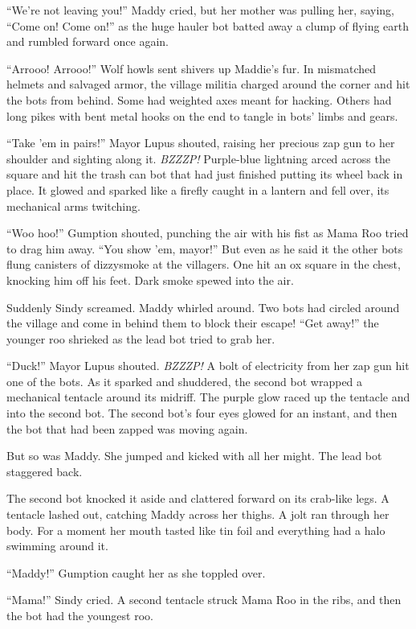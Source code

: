 \documentclass[10pt]{article}
\begin{document}
``We're not leaving you!'' Maddy cried, but her mother was pulling her,
saying, ``Come on! Come on!'' as the huge hauler bot batted away a clump
of flying earth and rumbled forward once again.

``Arrooo! Arrooo!'' Wolf howls sent shivers up Maddie's fur. In
mismatched helmets and salvaged armor, the village militia charged
around the corner and hit the bots from behind. Some had weighted axes
meant for hacking. Others had long pikes with bent metal hooks on the
end to tangle in bots' limbs and gears.

``Take 'em in pairs!'' Mayor Lupus shouted, raising her precious zap gun
to her shoulder and sighting along it. \emph{BZZZP!} Purple-blue
lightning arced across the square and hit the trash can bot that had
just finished putting its wheel back in place. It glowed and sparked
like a firefly caught in a lantern and fell over, its mechanical arms
twitching.

``Woo hoo!'' Gumption shouted, punching the air with his fist as Mama
Roo tried to drag him away. ``You show 'em, mayor!'' But even as he said
it the other bots flung canisters of dizzysmoke at the villagers. One
hit an ox square in the chest, knocking him off his feet. Dark smoke
spewed into the air.

Suddenly Sindy screamed. Maddy whirled around. Two bots had circled
around the village and come in behind them to block their escape! ``Get
away!'' the younger roo shrieked as the lead bot tried to grab her.

``Duck!'' Mayor Lupus shouted. \emph{BZZZP!} A bolt of electricity from
her zap gun hit one of the bots. As it sparked and shuddered, the second
bot wrapped a mechanical tentacle around its midriff. The purple glow
raced up the tentacle and into the second bot. The second bot's four
eyes glowed for an instant, and then the bot that had been zapped was
moving again.

But so was Maddy. She jumped and kicked with all her might. The lead bot
staggered back.

The second bot knocked it aside and clattered forward on its crab-like
legs. A tentacle lashed out, catching Maddy across her thighs. A jolt
ran through her body. For a moment her mouth tasted like tin foil and
everything had a halo swimming around it.

``Maddy!'' Gumption caught her as she toppled over.

``Mama!'' Sindy cried. A second tentacle struck Mama Roo in the ribs,
and then the bot had the youngest roo.
\end{document}
